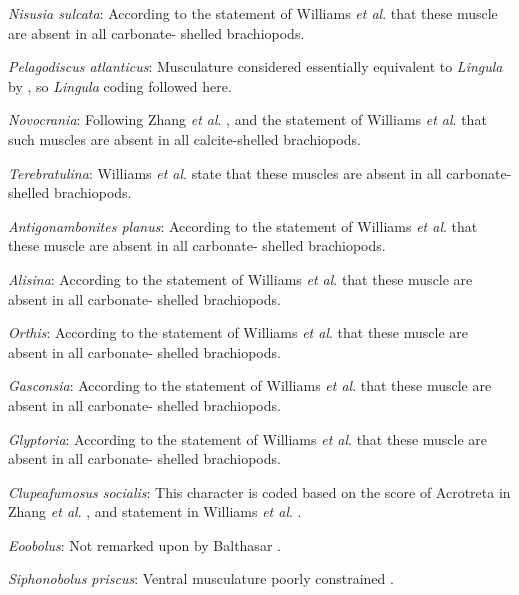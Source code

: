 \documentclass[openany]{book}
\theoremstyle{definition}
\theoremstyle{definition}
\theoremstyle{definition}
\theoremstyle{remark}
\begin{document}
\emph{Nisusia sulcata}: According to the statement of Williams \emph{et
al}. \citeyearpar[P.32]{Williams2000BrachiopodaLinguliformea} that these
muscle are absent in all carbonate- shelled brachiopods.

\emph{Pelagodiscus atlanticus}: Musculature considered essentially
equivalent to \emph{Lingula} by
\citet{Williams2000BrachiopodaLinguliformea}, so \emph{Lingula} coding
followed here.

\emph{Novocrania}: Following Zhang \emph{et al}.
\citeyearpar{Zhang2014Anearly}, and the statement of Williams \emph{et
al}. \citeyearpar{Williams2000BrachiopodaLinguliformea} that such
muscles are absent in all calcite-shelled brachiopods.

\emph{Terebratulina}: Williams \emph{et al}.
\citeyearpar[P.32]{Williams2000BrachiopodaLinguliformea} state that
these muscles are absent in all carbonate-shelled brachiopods.

\emph{Antigonambonites planus}: According to the statement of Williams
\emph{et al}. \citeyearpar[P.32]{Williams2000BrachiopodaLinguliformea}
that these muscle are absent in all carbonate- shelled brachiopods.

\emph{Alisina}: According to the statement of Williams \emph{et al}.
\citeyearpar[P.32]{Williams2000BrachiopodaLinguliformea} that these
muscle are absent in all carbonate- shelled brachiopods.

\emph{Orthis}: According to the statement of Williams \emph{et al}.
\citeyearpar[P.32]{Williams2000BrachiopodaLinguliformea} that these
muscle are absent in all carbonate- shelled brachiopods.

\emph{Gasconsia}: According to the statement of Williams \emph{et al}.
\citeyearpar[P.32]{Williams2000BrachiopodaLinguliformea} that these
muscle are absent in all carbonate- shelled brachiopods.

\emph{Glyptoria}: According to the statement of Williams \emph{et al}.
\citeyearpar[P.32]{Williams2000BrachiopodaLinguliformea} that these
muscle are absent in all carbonate- shelled brachiopods.

\emph{Clupeafumosus socialis}: This character is coded based on the
score of Acrotreta in Zhang \emph{et al}.
\citeyearpar{Zhang2014Anearly}, and statement in Williams \emph{et al}.
\citeyearpar[P.32]{Williams2000BrachiopodaLinguliformea}.

\emph{Eoobolus}: Not remarked upon by Balthasar
\citeyearpar{Balthasar2009Thebrachiopod}.

\emph{Siphonobolus priscus}: Ventral musculature poorly constrained
\citep{Williams2000BrachiopodaLinguliformea, Popov2009Earlyontogeny}.
\end{document}
